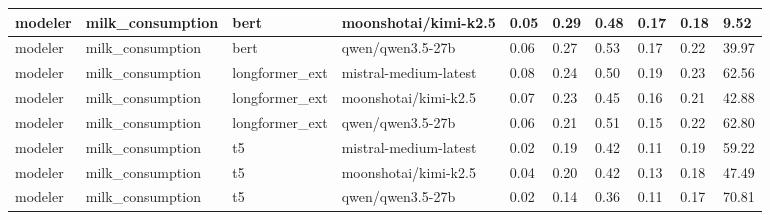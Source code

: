 \begin{tabular}{|l|l|l|l|l|l|l|l|l|l|}
 \hline
 modeler & milk\_consumption & bert & moonshotai/kimi-k2.5 & 0.05 & 0.29 & 0.48 & 0.17 & 0.18 & 9.52 \\
 \hline
 modeler & milk\_consumption & bert & qwen/qwen3.5-27b & 0.06 & 0.27 & 0.53 & 0.17 & 0.22 & 39.97 \\
 \hline
 modeler & milk\_consumption & longformer\_ext & mistral-medium-latest & 0.08 & 0.24 & 0.50 & 0.19 & 0.23 & 62.56 \\
 \hline
 modeler & milk\_consumption & longformer\_ext & moonshotai/kimi-k2.5 & 0.07 & 0.23 & 0.45 & 0.16 & 0.21 & 42.88 \\
 \hline
 modeler & milk\_consumption & longformer\_ext & qwen/qwen3.5-27b & 0.06 & 0.21 & 0.51 & 0.15 & 0.22 & 62.80 \\
 \hline
 modeler & milk\_consumption & t5 & mistral-medium-latest & 0.02 & 0.19 & 0.42 & 0.11 & 0.19 & 59.22 \\
 \hline
 modeler & milk\_consumption & t5 & moonshotai/kimi-k2.5 & 0.04 & 0.20 & 0.42 & 0.13 & 0.18 & 47.49 \\
 \hline
 modeler & milk\_consumption & t5 & qwen/qwen3.5-27b & 0.02 & 0.14 & 0.36 & 0.11 & 0.17 & 70.81 \\
\hline
\end{tabular}
